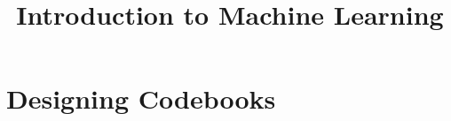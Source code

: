 



\newcommand{\titlefigure}{figure_man/hill-climbing.png}
\newcommand{\learninggoals}{
  \item Know what a codebook is
  \item Understand that codebooks generalize one-vs-one and one-vs-rest
  \item Know how to define a good codebook and error-correcting output codes (ECOC)
  \item Know how randomized hill-clmibing algorithm is used to find good codebooks
}

\title{Introduction to Machine Learning}
\date{}







\sloppy

\section{Designing Codebooks}

